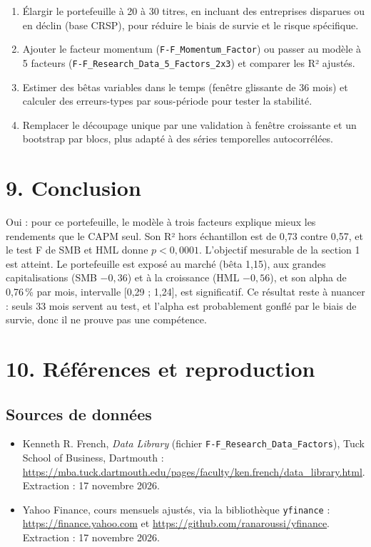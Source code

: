 \documentclass[12pt,a4paper]{article}
\begin{document}
\begin{enumerate}[leftmargin=*, itemsep=0.5em]
    \item Élargir le portefeuille à 20 à 30 titres, en incluant des entreprises disparues ou en déclin (base CRSP), pour réduire le biais de survie et le risque spécifique.

    \item Ajouter le facteur momentum (\texttt{F-F\_Momentum\_Factor}) ou passer au modèle à 5 facteurs (\texttt{F-F\_Research\_Data\_5\_Factors\_2x3}) et comparer les R² ajustés.

    \item Estimer des bêtas variables dans le temps (fenêtre glissante de 36 mois) et calculer des erreurs-types par sous-période pour tester la stabilité.

    \item Remplacer le découpage unique par une validation à fenêtre croissante et un bootstrap par blocs, plus adapté à des séries temporelles autocorrélées.
\end{enumerate}

\section*{9. Conclusion}

Oui : pour ce portefeuille, le modèle à trois facteurs explique mieux les rendements que le CAPM seul. Son R² hors échantillon est de 0,73 contre 0,57, et le test F de SMB et HML donne $p < 0{,}0001$. L'objectif mesurable de la section 1 est atteint. Le portefeuille est exposé au marché (bêta 1,15), aux grandes capitalisations (SMB $-0{,}36$) et à la croissance (HML $-0{,}56$), et son alpha de 0,76\,\% par mois, intervalle [0,29 ; 1,24], est significatif. Ce résultat reste à nuancer : seuls 33 mois servent au test, et l'alpha est probablement gonflé par le biais de survie, donc il ne prouve pas une compétence.

\section*{10. Références et reproduction}

\subsection*{Sources de données}

\begin{itemize}[leftmargin=*, itemsep=0.5em]
    \item Kenneth R. French, \textit{Data Library} (fichier \texttt{F-F\_Research\_Data\_Factors}), Tuck School of Business, Dartmouth :
    \url{https://mba.tuck.dartmouth.edu/pages/faculty/ken.french/data_library.html}.
    Extraction : 17 novembre 2026.

    \item Yahoo Finance, cours mensuels ajustés, via la bibliothèque \texttt{yfinance} :
    \url{https://finance.yahoo.com} et
    \url{https://github.com/ranaroussi/yfinance}.
    Extraction : 17 novembre 2026.
\end{itemize}
\end{document}
